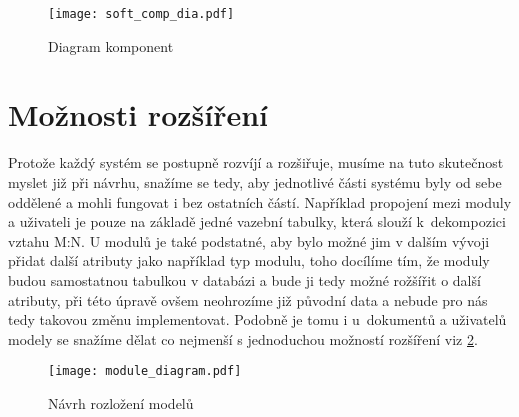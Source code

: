 \begin{figure}[H]
    \centering
    \texttt{[image: soft\_comp\_dia.pdf]}
    \caption{Diagram komponent}
    \label{fig:softCompDia}
\end{figure}

\section{Možnosti rozšíření}

Protože každý systém se postupně rozvíjí a rozšiřuje, musíme na tuto skuteč\-nost myslet již při návrhu, snažíme se tedy, aby jednotlivé části systému byly od sebe
oddělené a mohli fungovat i bez ostatních částí. Například propojení mezi moduly a uživateli je pouze na základě jedné vazební tabulky, která slouží k~dekompozici vztahu
M:N. U modulů je také podstatné, aby bylo možné jim v dalším vývoji přidat další atributy jako například typ modulu, toho docílíme tím, že moduly budou samostatnou tabulkou v databázi
a bude ji tedy možné rožšířit o další atributy, při této úpravě ovšem neohrozíme již původní data a nebude pro nás tedy takovou změnu implementovat. Podobně je tomu i u~dokumentů a uživatelů
modely se snažíme dělat co nejmenší s jednoduchou možností rozšíření viz \ref{fig:moduleDia}.

\begin{figure}[h]
    \centering
    \texttt{[image: module\_diagram.pdf]}
    \caption{Návrh rozložení modelů}
    \label{fig:moduleDia}
\end{figure}